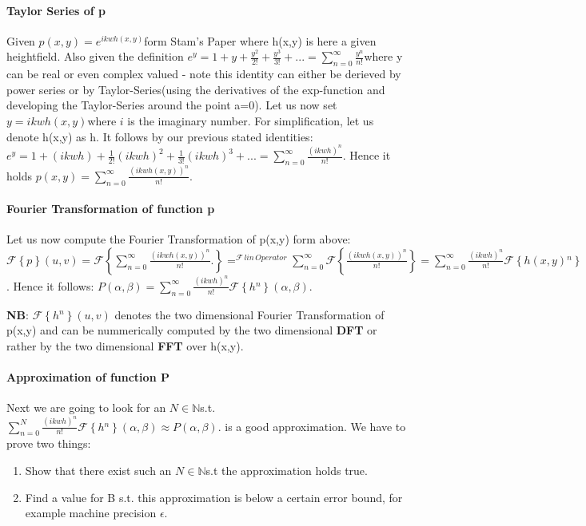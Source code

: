 \paragraph {Taylor Series of p}
Given $p(x,y)=e^{ikwh(x,y)}$form Stam's Paper where h(x,y) is here
a given heightfield. Also given the definition $e^{y}=1+y+\frac{y^{2}}{2!}+\frac{y^{3}}{3!}+...=\sum_{n=0}^{\infty}\frac{y^{n}}{n!}$where
y can be real or even complex valued - note this identity can either
be derieved by power series or by Taylor-Series(using the derivatives
of the exp-function and developing the Taylor-Series around the point
a=0). Let us now set $y=ikwh(x,y)$where $i$ is the imaginary number.
For simplification, let us denote h(x,y) as h. It follows by our previous
stated identities: $e^{y}=1+(ikwh)+\frac{1}{2!}(ikwh)^{2}+\frac{1}{3!}(ikwh)^{3}+...=\sum_{n=0}^{\infty}\frac{(ikwh)^{n}}{n!}$.
Hence it holds $p(x,y)=\sum_{n=0}^{\infty}\frac{(ikwh(x,y))^{n}}{n!}.$


\paragraph {Fourier Transformation of function p}

Let us now compute the Fourier Transformation of p(x,y) form above:$\mathcal{F}\left\{ p\right\} (u,v)=\mathcal{F}\left\{ \sum_{n=0}^{\infty}\frac{(ikwh(x,y))^{n}}{n!}.\right\} =^{\mathcal{F}\, lin\, Operator}\sum_{n=0}^{\infty}\mathcal{F}\left\{ \frac{(ikwh(x,y))^{n}}{n!}\right\} =\sum_{n=0}^{\infty}\frac{(ikwh)^{n}}{n!}\mathcal{F}\left\{ h(x,y){}^{n}\right\} $.
Hence it follows: $P(\alpha,\beta)=\sum_{n=0}^{\infty}\frac{(ikwh)^{n}}{n!}\mathcal{F}\left\{ h{}^{n}\right\} (\alpha,\beta)$.

\textbf{NB}: $\mathcal{F}\left\{ h{}^{n}\right\} (u,v)$ denotes the
two dimensional Fourier Transformation of p(x,y) and can be nummerically
computed by the two dimensional \textbf{DFT} or rather by the two
dimensional \textbf{FFT} over h(x,y). 


\paragraph {Approximation of function P}

Next we are going to look for an $N\mathbb{\in N}$s.t. $\sum_{n=0}^{N}\frac{(ikwh)^{n}}{n!}\mathcal{F}\left\{ h{}^{n}\right\} (\alpha,\beta)\approx P(\alpha,\beta)$.
is a good approximation. We have to prove two things:
\begin{enumerate}
\item Show that there exist such an $N\mathbb{\in N}$s.t the approximation
holds true.
\item Find a value for B s.t. this approximation is below a certain error
bound, for example machine precision $\epsilon$. 
\end{enumerate}

